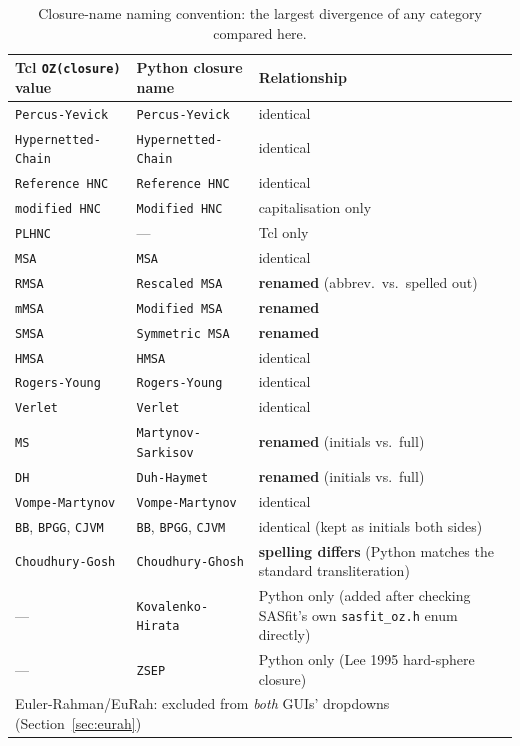 \documentclass[11pt,a4paper]{article}
\newcommand{\code}[1]{\texttt{#1}}
\begin{document}
\begin{table}[h]
\centering
\footnotesize
\begin{tabular}{lll}
\toprule
Tcl \code{OZ(closure)} value & Python closure name & Relationship \\
\midrule
\code{Percus-Yevick} & \code{Percus-Yevick} & identical \\
\code{Hypernetted-Chain} & \code{Hypernetted-Chain} & identical \\
\code{Reference HNC} & \code{Reference HNC} & identical \\
\code{modified HNC} & \code{Modified HNC} & capitalisation only \\
\code{PLHNC} & --- & Tcl only \\
\code{MSA} & \code{MSA} & identical \\
\code{RMSA} & \code{Rescaled MSA} & \textbf{renamed} (abbrev.\ vs.\ spelled out) \\
\code{mMSA} & \code{Modified MSA} & \textbf{renamed} \\
\code{SMSA} & \code{Symmetric MSA} & \textbf{renamed} \\
\code{HMSA} & \code{HMSA} & identical \\
\code{Rogers-Young} & \code{Rogers-Young} & identical \\
\code{Verlet} & \code{Verlet} & identical \\
\code{MS} & \code{Martynov-Sarkisov} & \textbf{renamed} (initials vs.\ full) \\
\code{DH} & \code{Duh-Haymet} & \textbf{renamed} (initials vs.\ full) \\
\code{Vompe-Martynov} & \code{Vompe-Martynov} & identical \\
\code{BB}, \code{BPGG}, \code{CJVM} & \code{BB}, \code{BPGG}, \code{CJVM} & identical (kept as initials both sides) \\
\code{Choudhury-Gosh} & \code{Choudhury-Ghosh} & \textbf{spelling differs} (Python matches the standard transliteration) \\
--- & \code{Kovalenko-Hirata} & Python only (added after checking SASfit's own \code{sasfit\_oz.h} enum directly) \\
--- & \code{ZSEP} & Python only (Lee 1995 hard-sphere closure) \\
\multicolumn{3}{l}{Euler-Rahman/EuRah: excluded from \emph{both} GUIs' dropdowns (Section~\ref{sec:eurah})} \\
\bottomrule
\end{tabular}
\caption{Closure-name naming convention: the largest divergence of any
category compared here.}
\label{tab:closure-naming}
\end{table}
\end{document}
